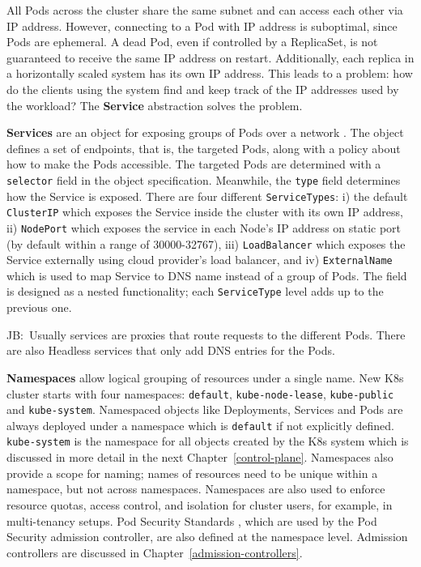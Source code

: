 \documentclass[english, 12pt, a4paper, sci, utf8, a-2b, online]{aaltothesis}
\newcommand{\mycomment}[3]{\textcolor{#1}{#2:~#3}}
\newcommand{\jb}[1]{\noindent\mycomment{aaltoRed}{JB}{#1}}
\begin{document}
All Pods across the cluster share the same subnet and can access each other via IP address. However, connecting to a Pod with IP address is suboptimal, since Pods are ephemeral. A dead Pod, even if controlled by a ReplicaSet, is not guaranteed to receive the same IP address on restart. Additionally, each replica in a horizontally scaled system has its own IP address. This leads to a problem: how do the clients using the system find and keep track of the IP addresses used by the workload? The \textbf{Service} abstraction solves the problem.

\textbf{Services} are an object for exposing groups of Pods over a network \cite{k8s-docs-services}. The object defines a set of endpoints, that is, the targeted Pods, along with a policy about how to make the Pods accessible. The targeted Pods are determined with a \texttt{selector} field in the object specification. Meanwhile, the \texttt{type} field determines how the Service is exposed. There are four different \texttt{ServiceTypes}: i) the default \texttt{ClusterIP} which exposes the Service inside the cluster with its own IP address, ii) \texttt{NodePort} which exposes the service in each Node's IP address on static port (by default within a range of 30000-32767), iii) \texttt{LoadBalancer} which exposes the Service externally using cloud provider's load balancer, and iv) \texttt{ExternalName} which is used to map Service to DNS name instead of a group of Pods. The field is designed as a nested functionality; each \texttt{ServiceType} level adds up to the previous one.

\jb{Usually services are proxies that route requests to the different Pods. There are also Headless services that only add DNS entries for the Pods.}

\textbf{Namespaces} allow logical grouping of resources under a single name. New K8s cluster starts with four namespaces: \texttt{default}, \texttt{kube-node-lease}, \texttt{kube-public} and \texttt{kube-system}. Namespaced objects like Deployments, Services and Pods are always deployed under a namespace which is \texttt{default} if not explicitly defined. \texttt{kube-system} is the namespace for all objects created by the K8s system which is discussed in more detail in the next Chapter~\ref{control-plane}. Namespaces also provide a scope for naming; names of resources need to be unique within a namespace, but not across namespaces. Namespaces are also used to enforce resource quotas, access control, and isolation for cluster users, for example, in multi-tenancy setups. Pod Security Standards \cite{k8s-docs-pss}, which are used by the Pod Security admission controller, are also defined at the namespace level. Admission controllers are discussed in Chapter~\ref{admission-controllers}.
\end{document}
